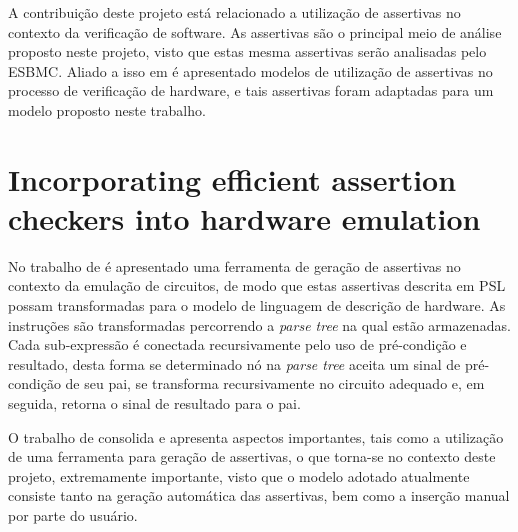 \par
A contribuição deste projeto está relacionado a utilização de assertivas no contexto da verificação de software. As assertivas são o principal meio de análise proposto neste projeto, visto que estas mesma assertivas serão analisadas pelo ESBMC. Aliado a isso em \citeauthor{di2012use} é apresentado modelos de utilização de assertivas no processo de verificação de hardware, e tais assertivas foram adaptadas para um modelo proposto neste trabalho.

\section{Incorporating efficient assertion checkers into hardware emulation}
\par
No trabalho de \citeauthor{boule2005incorporating} é apresentado uma ferramenta de geração de assertivas no contexto da emulação de circuitos, de modo que estas assertivas descrita em PSL possam transformadas para o modelo de linguagem de descrição de hardware. As instruções são transformadas percorrendo a \textit{parse tree} na qual estão armazenadas. Cada sub-expressão é conectada recursivamente pelo uso de pré-condição e resultado, desta forma se determinado nó na \textit{parse tree} aceita um sinal de pré-condição de seu pai, se transforma recursivamente no circuito adequado e, em seguida, retorna o sinal de resultado para o pai.

\par
O trabalho de \citeauthor{boule2005incorporating} consolida e apresenta aspectos importantes, tais como a utilização de uma ferramenta para geração de assertivas, o que torna-se no contexto deste projeto, extremamente importante, visto que o modelo adotado atualmente consiste tanto na geração automática das assertivas, bem como a inserção manual por parte do usuário.
